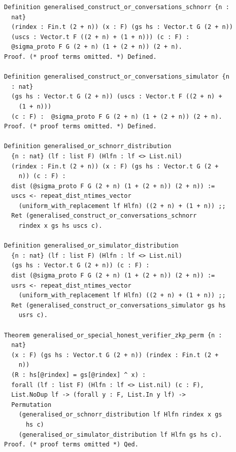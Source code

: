 \begin{lstlisting}[frame=single, language=Coq, caption={The $n$-ary Or composition and its zero-knowledge theorem ({\rocq[\texttt{Crypto/OrSigmaGen.v}]{generalised_construct_or_conversations_schnorr}})},
label={or_proof},captionpos=t, basicstyle=\ttfamily\scriptsize,
abovecaptionskip=-\medskipamount]
Definition generalised_construct_or_conversations_schnorr {n :
  nat}
  (rindex : Fin.t (2 + n)) (x : F) (gs hs : Vector.t G (2 + n))
  (uscs : Vector.t F ((2 + n) + (1 + n))) (c : F) :
  @sigma_proto F G (2 + n) (1 + (2 + n)) (2 + n).
Proof. (* proof terms omitted. *) Defined.

Definition generalised_construct_or_conversations_simulator {n
  : nat}
  (gs hs : Vector.t G (2 + n)) (uscs : Vector.t F ((2 + n) +
    (1 + n)))
  (c : F) :  @sigma_proto F G (2 + n) (1 + (2 + n)) (2 + n).
Proof. (* proof terms omitted. *) Defined.

Definition generalised_or_schnorr_distribution
  {n : nat} (lf : list F) (Hlfn : lf <> List.nil)
  (rindex : Fin.t (2 + n)) (x : F) (gs hs : Vector.t G (2 +
    n)) (c : F) :
  dist (@sigma_proto F G (2 + n) (1 + (2 + n)) (2 + n)) :=
  uscs <- repeat_dist_ntimes_vector
    (uniform_with_replacement lf Hlfn) ((2 + n) + (1 + n)) ;;
  Ret (generalised_construct_or_conversations_schnorr
    rindex x gs hs uscs c).

Definition generalised_or_simulator_distribution
  {n : nat} (lf : list F) (Hlfn : lf <> List.nil)
  (gs hs : Vector.t G (2 + n)) (c : F) :
  dist (@sigma_proto F G (2 + n) (1 + (2 + n)) (2 + n)) :=
  usrs <- repeat_dist_ntimes_vector
    (uniform_with_replacement lf Hlfn) ((2 + n) + (1 + n)) ;;
  Ret (generalised_construct_or_conversations_simulator gs hs
    usrs c).

Theorem generalised_or_special_honest_verifier_zkp_perm {n :
  nat}
  (x : F) (gs hs : Vector.t G (2 + n)) (rindex : Fin.t (2 +
    n))
  (R : hs[@rindex] = gs[@rindex] ^ x) :
  forall (lf : list F) (Hlfn : lf <> List.nil) (c : F),
  List.NoDup lf -> (forall y : F, List.In y lf) ->
  Permutation
    (generalised_or_schnorr_distribution lf Hlfn rindex x gs
      hs c)
    (generalised_or_simulator_distribution lf Hlfn gs hs c).
Proof. (* proof terms omitted *) Qed.
\end{lstlisting}

